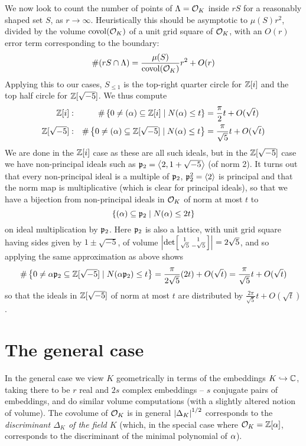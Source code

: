 \documentclass[11pt]{article}
\begin{document}
We now look to count the number of points of $\Lambda = \mathcal{O}_K$ inside $rS$ for a reasonably shaped set $S$, as $r \to \infty$. Heuristically this should be asymptotic to $\mu(S)r^2$, divided by the volume $\operatorname{covol}(\mathcal{O}_K)$ of a unit grid square of $\mathcal{O}_K$, with an $O(r)$ error term corresponding to the boundary:
$$
    \#(rS \cap \Lambda) = \frac{\mu(S)}{\operatorname{covol}(\mathcal{O}_K)}r^2 + O(r)
$$
Applying this to our cases, $S_{\leq 1}$ is the top-right quarter circle for $\mathbb{Z}[i]$ and the top half circle for $\mathbb{Z}[\sqrt{-5}]$. We thus compute
\begin{align*}
    \mathbb{Z}[i]: &&\#\left\{  0 \neq (\alpha) \subseteq \mathbb{Z}[i] \mid N(\alpha) \leq t  \right\} &= \frac{\pi}{2}t + O(\sqrt{t}) \\
    \mathbb{Z}[\sqrt{-5}]: &&\#\left\{  0 \neq (\alpha) \subseteq \mathbb{Z}[\sqrt{-5}] \mid N(\alpha) \leq t  \right\} &= \frac{\pi}{\sqrt{5}}t + O(\sqrt{t})
\end{align*}
We are done in the $\mathbb{Z}[i]$ case as these are all such ideals, but in the $\mathbb{Z}[\sqrt{-5}]$ case we have non-principal ideals such as $\mathfrak{p}_2 = \left\langle 2, 1 + \sqrt{-5} \right\rangle$ (of norm 2). It turns out that every non-principal ideal is a multiple of $\mathfrak{p}_2$, $\mathfrak{p}_2^2 = \left\langle 2 \right\rangle$ is principal and that the norm map is multiplicative (which is clear for principal ideals), so that we have a bijection from non-principal ideals in $\mathcal{O}_K$ of norm at most $t$ to
$$
    \left\{  (\alpha) \subseteq \mathfrak{p}_2 \mid N(\alpha) \leq 2t  \right\}
$$
on ideal multiplication by $\mathfrak{p}_2$. Here $\mathfrak{p}_2$ is also a lattice, with unit grid square having sides given by $1 \pm \sqrt{-5}$, of volume $\left| \det\begin{bsmallmatrix}
    1 & 1 \\
    \sqrt{5} & -\sqrt{5}
\end{bsmallmatrix} \right| = 2\sqrt{5}$, and so applying the same approximation as above shows
$$
    \#\left\{  0 \neq \alpha \mathfrak{p}_2 \subseteq \mathbb{Z}[\sqrt{-5}] \mid N(\alpha \mathfrak{p}_2) \leq t  \right\} = \frac{\pi}{2\sqrt{5}}(2t) + O(\sqrt{t}) = \frac{\pi}{\sqrt{5}}t + O(\sqrt{t})
$$
so that the ideals in $\mathbb{Z}[\sqrt{-5}]$ of norm at most $t$ are distributed by $\frac{2\pi}{\sqrt{5}}t + O(\sqrt{t})$.
\section{The general case}
In the general case we view $K$ geometrically in terms of the embeddings $K \hookrightarrow \mathbb{C}$, taking there to be $r$ real and $2s$ complex embeddings -- $s$ conjugate pairs of embeddings, and do similar volume computations (with a slightly altered notion of volume). The covolume of $\mathcal{O}_K$ is in general $\left| \Delta_K \right|^{1/2}$ corresponds to the \emph{discriminant $\Delta_K$ of the field $K$} (which, in the special case where $\mathcal{O}_K = \mathbb{Z}[\alpha]$, corresponds to the discriminant of the minimal polynomial of $\alpha$). 
\end{document}
